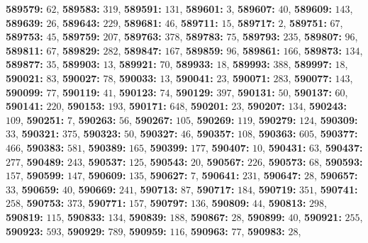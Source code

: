 \textsf{\bfseries 589579:} $62$, \textsf{\bfseries 589583:} $319$, \textsf{\bfseries 589591:} $131$, \textsf{\bfseries 589601:} $3$, \textsf{\bfseries 589607:} $40$, \textsf{\bfseries 589609:} $143$, \textsf{\bfseries 589639:} $26$, \textsf{\bfseries 589643:} $229$, \textsf{\bfseries 589681:} $46$, \textsf{\bfseries 589711:} $15$, \textsf{\bfseries 589717:} $2$, \textsf{\bfseries 589751:} $67$, \textsf{\bfseries 589753:} $45$, \textsf{\bfseries 589759:} $207$, \textsf{\bfseries 589763:} $378$, \textsf{\bfseries 589783:} $75$, \textsf{\bfseries 589793:} $235$, \textsf{\bfseries 589807:} $96$, \textsf{\bfseries 589811:} $67$, \textsf{\bfseries 589829:} $282$, \textsf{\bfseries 589847:} $167$, \textsf{\bfseries 589859:} $96$, \textsf{\bfseries 589861:} $166$, \textsf{\bfseries 589873:} $134$, \textsf{\bfseries 589877:} $35$, \textsf{\bfseries 589903:} $13$, \textsf{\bfseries 589921:} $70$, \textsf{\bfseries 589933:} $18$, \textsf{\bfseries 589993:} $388$, \textsf{\bfseries 589997:} $18$, \textsf{\bfseries 590021:} $83$, \textsf{\bfseries 590027:} $78$, \textsf{\bfseries 590033:} $13$, \textsf{\bfseries 590041:} $23$, \textsf{\bfseries 590071:} $283$, \textsf{\bfseries 590077:} $143$, \textsf{\bfseries 590099:} $77$, \textsf{\bfseries 590119:} $41$, \textsf{\bfseries 590123:} $74$, \textsf{\bfseries 590129:} $397$, \textsf{\bfseries 590131:} $50$, \textsf{\bfseries 590137:} $60$, \textsf{\bfseries 590141:} $220$, \textsf{\bfseries 590153:} $193$, \textsf{\bfseries 590171:} $648$, \textsf{\bfseries 590201:} $23$, \textsf{\bfseries 590207:} $134$, \textsf{\bfseries 590243:} $109$, \textsf{\bfseries 590251:} $7$, \textsf{\bfseries 590263:} $56$, \textsf{\bfseries 590267:} $105$, \textsf{\bfseries 590269:} $119$, \textsf{\bfseries 590279:} $124$, \textsf{\bfseries 590309:} $33$, \textsf{\bfseries 590321:} $375$, \textsf{\bfseries 590323:} $50$, \textsf{\bfseries 590327:} $46$, \textsf{\bfseries 590357:} $108$, \textsf{\bfseries 590363:} $605$, \textsf{\bfseries 590377:} $466$, \textsf{\bfseries 590383:} $581$, \textsf{\bfseries 590389:} $165$, \textsf{\bfseries 590399:} $177$, \textsf{\bfseries 590407:} $10$, \textsf{\bfseries 590431:} $63$, \textsf{\bfseries 590437:} $277$, \textsf{\bfseries 590489:} $243$, \textsf{\bfseries 590537:} $125$, \textsf{\bfseries 590543:} $20$, \textsf{\bfseries 590567:} $226$, \textsf{\bfseries 590573:} $68$, \textsf{\bfseries 590593:} $157$, \textsf{\bfseries 590599:} $147$, \textsf{\bfseries 590609:} $135$, \textsf{\bfseries 590627:} $7$, \textsf{\bfseries 590641:} $231$, \textsf{\bfseries 590647:} $28$, \textsf{\bfseries 590657:} $33$, \textsf{\bfseries 590659:} $40$, \textsf{\bfseries 590669:} $241$, \textsf{\bfseries 590713:} $87$, \textsf{\bfseries 590717:} $184$, \textsf{\bfseries 590719:} $351$, \textsf{\bfseries 590741:} $258$, \textsf{\bfseries 590753:} $373$, \textsf{\bfseries 590771:} $157$, \textsf{\bfseries 590797:} $136$, \textsf{\bfseries 590809:} $44$, \textsf{\bfseries 590813:} $298$, \textsf{\bfseries 590819:} $115$, \textsf{\bfseries 590833:} $134$, \textsf{\bfseries 590839:} $188$, \textsf{\bfseries 590867:} $28$, \textsf{\bfseries 590899:} $40$, \textsf{\bfseries 590921:} $255$, \textsf{\bfseries 590923:} $593$, \textsf{\bfseries 590929:} $789$, \textsf{\bfseries 590959:} $116$, \textsf{\bfseries 590963:} $77$, \textsf{\bfseries 590983:} $28$, 
